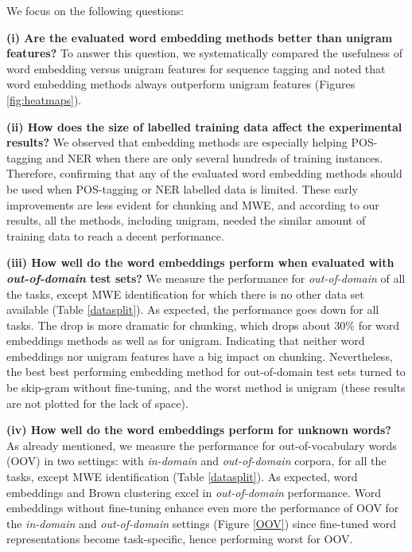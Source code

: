 We focus on the following questions:

\textbf{(i) Are the evaluated word embedding methods better than unigram features?}
To answer this question, we systematically compared the usefulness of word embedding versus
unigram features for sequence tagging and noted that word embedding methods always outperform 
unigram features (Figures \ref{fig:heatmaps}). 

\textbf{(ii) How does the size of labelled training data affect the experimental results?}
We observed that embedding methods are especially helping POS-tagging and NER when there are only several hundreds of training instances. 
Therefore, confirming that any of the evaluated word embedding methods should be used when POS-tagging or NER labelled data is limited.
These early improvements are less evident for chunking and MWE, and according to our results, all the methods, including unigram, needed the similar amount of training data to reach a decent performance.

\textbf{(iii) How well do the word embeddings perform when evaluated with \textit{out-of-domain} test sets?}
We measure the performance for \textit{out-of-domain} of all the tasks, except MWE identification for which there is no other data set available (Table \ref{datasplit}).
As expected, the performance goes down for all tasks. The drop is more dramatic for chunking, which drops about 30\% for word embeddings methods as well as for unigram. 
Indicating that neither word embeddings nor unigram features have a big impact on chunking.
Nevertheless, the best best performing embedding method for out-of-domain test sets turned to be skip-gram without fine-tuning, and the worst method is unigram (these results are not plotted for the lack of space).

\textbf{(iv) How well do the word embeddings perform for unknown words?}
As already mentioned, we measure the performance for out-of-vocabulary words (OOV)
in two settings: with \textit{in-domain} and \textit{out-of-domain} corpora, for all the tasks, except MWE identification (Table \ref{datasplit}).
As expected, word embeddings and Brown clustering excel in \textit{out-of-domain} performance.
Word embeddings without fine-tuning enhance even more the performance of OOV 
for the \textit{in-domain} and \textit{out-of-domain} settings (Figure \ref{OOV}) since fine-tuned
word representations become task-specific, hence performing worst for OOV.

